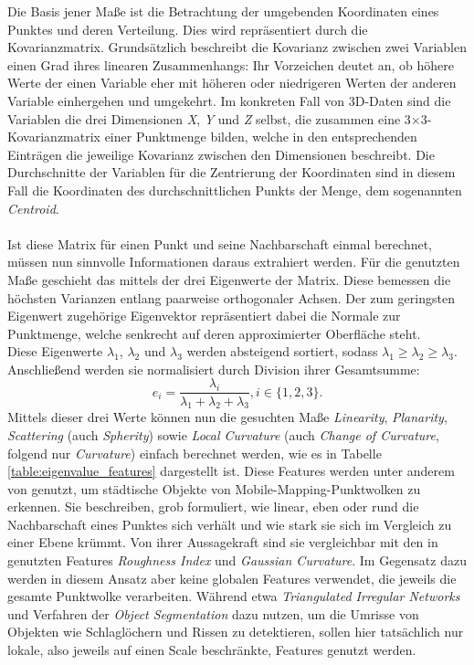 Die Basis jener Maße ist die Betrachtung der umgebenden Koordinaten eines Punktes und deren Verteilung. Dies wird repräsentiert durch die Kovarianzmatrix. Grundsätzlich beschreibt die Kovarianz zwischen zwei Variablen einen Grad ihres linearen Zusammenhangs: Ihr Vorzeichen deutet an, ob höhere Werte der einen Variable eher mit höheren oder niedrigeren Werten der anderen Variable einhergehen und umgekehrt. Im konkreten Fall von 3D-Daten sind die Variablen die drei Dimensionen \textit{X}, \textit{Y} und \textit{Z} selbst, die zusammen eine 3×3-Kovarianzmatrix einer Punktmenge bilden, welche in den entsprechenden Einträgen die jeweilige Kovarianz zwischen den Dimensionen beschreibt. Die Durchschnitte der Variablen für die Zentrierung der Koordinaten sind in diesem Fall die Koordinaten des durchschnittlichen Punkts der Menge, dem sogenannten \textit{Centroid}. \\\\
Ist diese Matrix für einen Punkt und seine Nachbarschaft einmal berechnet, müssen nun sinnvolle Informationen daraus extrahiert werden. Für die genutzten Maße geschieht das mittels der drei Eigenwerte der Matrix. Diese bemessen die höchsten Varianzen entlang paarweise orthogonaler Achsen. Der zum geringsten Eigenwert zugehörige Eigenvektor repräsentiert dabei die Normale zur Punktmenge, welche senkrecht auf deren approximierter Oberfläche steht. \\
Diese Eigenwerte $\lambda_1$, $\lambda_2$ und $\lambda_3$ werden absteigend sortiert, sodass $\lambda_1 \geq \lambda_2 \geq \lambda_3$. Anschließend werden sie normalisiert durch Division ihrer Gesamtsumme: 
\begin{equation}
e_i = \frac{\lambda_i}{\lambda_1 + \lambda_2 + \lambda_3}, i \in \{1, 2, 3\}.
\end{equation}
Mittels dieser drei Werte können nun die gesuchten Maße \textit{Linearity}, \textit{Planarity}, \textit{Scattering} (auch \textit{Spherity}) sowie \textit{Local Curvature} (auch \textit{Change of Curvature}, folgend nur \textit{Curvature}) einfach berechnet werden, wie es in Tabelle \ref{table:eigenvalue_features} dargestellt ist. Diese Features werden unter anderem von \cite{Zaboli.etal-2019} genutzt, um städtische Objekte von Mobile-Mapping-Punktwolken zu erkennen. Sie beschreiben, grob formuliert, wie linear, eben oder rund die Nachbarschaft eines Punktes sich verhält und wie stark sie sich im Vergleich zu einer Ebene krümmt. Von ihrer Aussagekraft sind sie vergleichbar mit den in \cite{Zhiqiang.etal-2019} genutzten Features \textit{Roughness Index} und \textit{Gaussian Curvature}. Im Gegensatz dazu werden in diesem Ansatz aber keine globalen Features verwendet, die jeweils die gesamte Punktwolke verarbeiten. Während etwa \cite{Zhiqiang.etal-2019} \textit{Triangulated Irregular Networks} und Verfahren der \textit{Object Segmentation} dazu nutzen, um die Umrisse von Objekten wie Schlaglöchern und Rissen zu detektieren, sollen hier tatsächlich nur lokale, also jeweils auf einen Scale beschränkte, Features genutzt werden.

